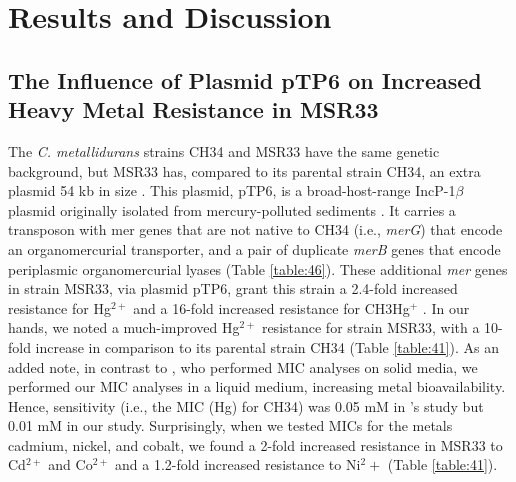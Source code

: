 \section{Results and Discussion}

\subsection{The Influence of Plasmid pTP6 on Increased Heavy Metal Resistance in MSR33}

The \textit{C. metallidurans} strains CH34 and MSR33 have the same genetic background, but MSR33 has, compared to its parental strain CH34, an extra plasmid 54 kb in size \citep{rojas2011characterization}. This plasmid, pTP6, is a broad-host-range IncP-1$\beta$ plasmid originally isolated from mercury-polluted sediments \citep{smalla2006increased}. It carries a transposon with mer genes that are not native to CH34 (i.e., \textit{merG}) that encode an organomercurial transporter, and a pair of duplicate \textit{merB} genes that encode periplasmic organomercurial lyases (Table \ref{table:46}). These additional \textit{mer} genes in strain MSR33, via plasmid pTP6, grant this strain a 2.4-fold increased resistance for Hg$^{2+}$ and a 16-fold increased resistance for CH3Hg$^+$ \citep{rojas2011characterization}. In our hands, we noted a much-improved Hg$^{2+}$ resistance for strain MSR33, with a 10-fold increase in comparison to its parental strain CH34 (Table \ref{table:41}). As an added note, in contrast to \citet{rojas2011characterization}, who performed MIC analyses on solid media, we performed our MIC analyses in a liquid medium, increasing metal bioavailability. Hence, sensitivity (i.e., the MIC (Hg) for CH34) was 0.05 mM in \citeauthor{rojas2011characterization}’s study  but 0.01 mM in our study. Surprisingly, when we tested MICs for the metals cadmium, nickel, and cobalt, we found a 2-fold increased resistance in MSR33 to Cd$^{2+}$ and Co$^{2+}$ and a 1.2-fold increased resistance to Ni$^2+$ (Table \ref{table:41}).
